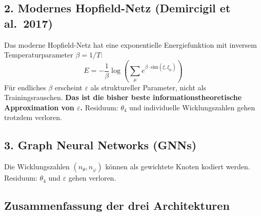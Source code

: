 \subsection*{2. Modernes Hopfield-Netz (Demircigil et al.\ 2017)}

Das moderne Hopfield-Netz hat eine exponentielle Energiefunktion mit
inversem Temperaturparameter $\beta = 1/T$:
\begin{equation}
  E = -\frac{1}{\beta}\log\!\left(\sum_\mu e^{\beta\cdot\text{sim}(\xi,\xi_\mu)}\right)
  \tag{243.13}
\end{equation}
Für endliches $\beta$ erscheint $\varepsilon$ als struktureller Parameter,
nicht als Trainingsrauschen. \textbf{Das ist die bisher beste
informationstheoretische Approximation von $\varepsilon$.}
Residuum: $\theta_4$ und individuelle Wicklungszahlen gehen trotzdem verloren.

\subsection*{3. Graph Neural Networks (GNNs)}

Die Wicklungszahlen $(n_\theta,n_\varphi)$ können als gewichtete Knoten
kodiert werden. Residuum: $\theta_4$ und $\varepsilon$ gehen verloren.

\subsection*{Zusammenfassung der drei Architekturen}

\begin{center}
\renewcommand{\arraystretch}{1.3}
{\small
{}
}
\end{center}

